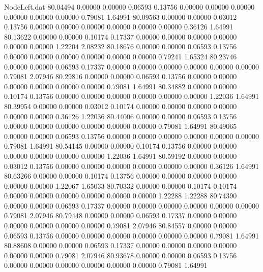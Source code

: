 \begin{filecontents}{NodeLeft.dat}
  80.04494    0.00000    0.00000     0.06593    0.13756    0.00000    0.00000    0.00000    0.00000    0.00000    0.00000    0.79081    1.64991
  80.09563    0.00000    0.00000     0.03012    0.13756    0.00000    0.00000    0.00000    0.00000    0.00000    0.00000    0.36126    1.64991
  80.13622    0.00000    0.00000     0.10174    0.17337    0.00000    0.00000    0.00000    0.00000    0.00000    0.00000    1.22204    2.08232
  80.18676    0.00000    0.00000     0.06593    0.13756    0.00000    0.00000    0.00000    0.00000    0.00000    0.00000    0.79241    1.65324
  80.23746    0.00000    0.00000     0.06593    0.17337    0.00000    0.00000    0.00000    0.00000    0.00000    0.00000    0.79081    2.07946
  80.29816    0.00000    0.00000     0.06593    0.13756    0.00000    0.00000    0.00000    0.00000    0.00000    0.00000    0.79081    1.64991
  80.34882    0.00000    0.00000     0.10174    0.13756    0.00000    0.00000    0.00000    0.00000    0.00000    0.00000    1.22036    1.64991
  80.39954    0.00000    0.00000     0.03012    0.10174    0.00000    0.00000    0.00000    0.00000    0.00000    0.00000    0.36126    1.22036
  80.44006    0.00000    0.00000     0.06593    0.13756    0.00000    0.00000    0.00000    0.00000    0.00000    0.00000    0.79081    1.64991
  80.49065    0.00000    0.00000     0.06593    0.13756    0.00000    0.00000    0.00000    0.00000    0.00000    0.00000    0.79081    1.64991
  80.54145    0.00000    0.00000     0.10174    0.13756    0.00000    0.00000    0.00000    0.00000    0.00000    0.00000    1.22036    1.64991
  80.59192    0.00000    0.00000     0.03012    0.13756    0.00000    0.00000    0.00000    0.00000    0.00000    0.00000    0.36126    1.64991
  80.63266    0.00000    0.00000     0.10174    0.13756    0.00000    0.00000    0.00000    0.00000    0.00000    0.00000    1.22067    1.65033
  80.70332    0.00000    0.00000     0.10174    0.10174    0.00000    0.00000    0.00000    0.00000    0.00000    0.00000    1.22288    1.22288
  80.74390    0.00000    0.00000     0.06593    0.17337    0.00000    0.00000    0.00000    0.00000    0.00000    0.00000    0.79081    2.07946
  80.79448    0.00000    0.00000     0.06593    0.17337    0.00000    0.00000    0.00000    0.00000    0.00000    0.00000    0.79081    2.07946
  80.84557    0.00000    0.00000     0.06593    0.13756    0.00000    0.00000    0.00000    0.00000    0.00000    0.00000    0.79081    1.64991
  80.88608    0.00000    0.00000     0.06593    0.17337    0.00000    0.00000    0.00000    0.00000    0.00000    0.00000    0.79081    2.07946
  80.93678    0.00000    0.00000     0.06593    0.13756    0.00000    0.00000    0.00000    0.00000    0.00000    0.00000    0.79081    1.64991

\end{filecontents}
